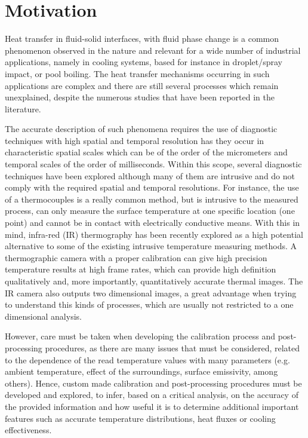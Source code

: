 \section{Motivation}
\label{sec:int_motivation}

\par Heat transfer in fluid-solid interfaces, with fluid phase change is a common phenomenon observed  in the nature and relevant for a wide number of industrial applications, namely in cooling systems, based for instance in droplet/spray impact, or pool boiling. The heat transfer mechanisms occurring in such applications are complex and there are still several processes which remain unexplained, despite the numerous studies that have been reported in the literature.\\

\par The accurate description of such phenomena requires the use of diagnostic techniques with high spatial and temporal resolution has they occur in characteristic spatial scales which can be of the order of the micrometers and temporal scales of the order of milliseconds. Within this scope, several diagnostic techniques have been explored although many of them are intrusive and do not comply with the required spatial and temporal resolutions. For instance, the use of a thermocouples is a really common method, but is  intrusive to the measured process, can only measure the surface temperature at one specific location (one point) and cannot be in contact with electrically conductive means. With this in mind, infra-red (IR) thermography has been recently explored as a high potential alternative to some of the existing intrusive temperature measuring methods. A thermographic camera with a proper calibration can give high precision temperature results at high frame rates, which can provide high definition qualitatively and, more importantly, quantitatively accurate thermal images. The IR camera also outputs two dimensional images, a great advantage when trying to understand this kinds of processes, which are usually not restricted to a one dimensional analysis. \\ 

\par However, care must be taken when developing the calibration process and post-processing procedures, as there are many issues that must be considered, related to the dependence of the read temperature values with many parameters (e.g. ambient temperature, effect of the surroundings, surface emissivity, among others). Hence, custom made calibration and post-processing procedures must be developed and explored, to infer, based on a critical analysis, on the accuracy of the provided information and how useful it is to determine additional important features such as accurate temperature distributions, heat fluxes or cooling effectiveness.\\

